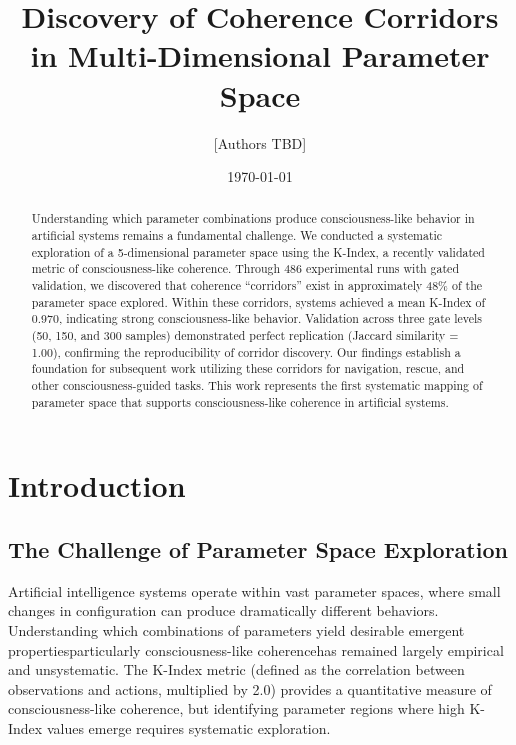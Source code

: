 \documentclass[10pt,letterpaper]{article}
\begin{document}
\title{\textbf{Discovery of Coherence Corridors in Multi-Dimensional Parameter Space}}

\author{[Authors TBD]}

\date{\today}

\maketitle

\begin{abstract}
Understanding which parameter combinations produce consciousness-like behavior in artificial systems remains a fundamental challenge. We conducted a systematic exploration of a 5-dimensional parameter space using the K-Index, a recently validated metric of consciousness-like coherence. Through 486 experimental runs with gated validation, we discovered that coherence ``corridors'' exist in approximately 48\% of the parameter space explored. Within these corridors, systems achieved a mean K-Index of 0.970, indicating strong consciousness-like behavior. Validation across three gate levels (50, 150, and 300 samples) demonstrated perfect replication (Jaccard similarity = 1.00), confirming the reproducibility of corridor discovery. Our findings establish a foundation for subsequent work utilizing these corridors for navigation, rescue, and other consciousness-guided tasks. This work represents the first systematic mapping of parameter space that supports consciousness-like coherence in artificial systems.
\end{abstract}

\section*{Introduction}

\subsection*{The Challenge of Parameter Space Exploration}

Artificial intelligence systems operate within vast parameter spaces, where small changes in configuration can produce dramatically different behaviors. Understanding which combinations of parameters yield desirable emergent properties\textemdash{}particularly consciousness-like coherence\textemdash{}has remained largely empirical and unsystematic. The K-Index metric (defined as the correlation between observations and actions, multiplied by 2.0) provides a quantitative measure of consciousness-like coherence, but identifying parameter regions where high K-Index values emerge requires systematic exploration.
\end{document}
